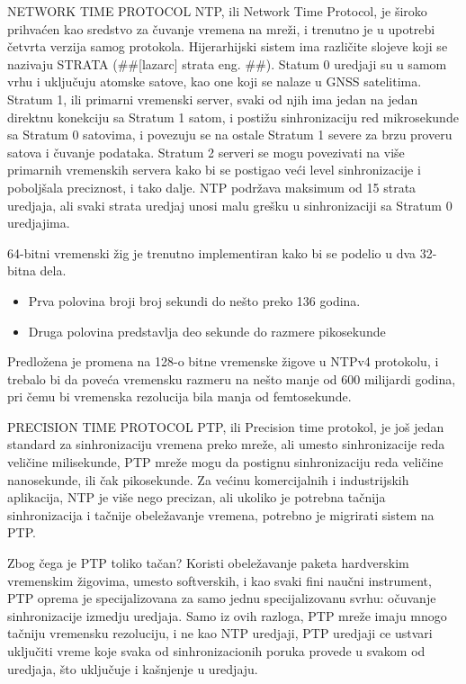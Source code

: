 \documentclass[a4paper,12pt, master]{etf}
\begin{document}
	NETWORK TIME PROTOCOL
	NTP, ili Network Time Protocol, je \v{s}iroko prihva\'{c}en kao sredstvo za \v{c}uvanje vremena na 
	mre\v{z}i, i trenutno je u upotrebi \v{c}etvrta verzija samog protokola. Hijerarhijski sistem ima 
	razli\v{c}ite slojeve koji se nazivaju STRATA (\#\#[lazarc] strata eng. \#\#). Statum 0 
	uredjaji su u samom vrhu i uklju\v{c}uju atomske satove, kao one koji se nalaze u GNSS 
	satelitima.	Stratum 1, ili primarni vremenski server, svaki od njih ima jedan na jedan 
	direktnu konekciju sa Stratum 1 satom, i posti\v{z}u sinhronizaciju red mikrosekunde sa Stratum 
	0 satovima, i povezuju se na ostale Stratum 1 severe za brzu proveru satova i \v{c}uvanje 
	podataka. Stratum 2 serveri se mogu povezivati na vi\v{s}e primarnih vremenskih servera kako 
	bi se postigao ve\'{c}i level sinhronizacije i pobolj\v{s}ala preciznost, i tako dalje. NTP 
	podr\v{z}ava maksimum od 15 strata uredjaja, ali svaki strata uredjaj unosi malu gre\v{s}ku u 
	sinhronizaciji sa Stratum 0 uredjajima.

	64-bitni vremenski \v{z}ig je trenutno implementiran kako bi se podelio u dva 32-bitna dela. 
	\begin{itemize}
		\item Prva polovina broji broj sekundi do ne\v{s}to preko 136 godina.
		\item Druga polovina predstavlja deo sekunde do razmere pikosekunde
	\end{itemize}

	Predlo\v{z}ena je promena na 128-o bitne vremenske \v{z}igove u NTPv4 protokolu, i trebalo bi da 
	pove\'{c}a vremensku razmeru na ne\v{s}to manje od 600 milijardi godina, pri \v{c}emu bi vremenska 
	rezolucija bila manja od femtosekunde.

	PRECISION TIME PROTOCOL
	PTP, ili Precision time protokol, je jo\v{s} jedan standard za sinhronizaciju vremena preko 
	mre\v{z}e, ali umesto sinhronizacije reda veli\v{c}ine milisekunde, PTP mre\v{z}e mogu da postignu 
	sinhronizaciju reda veli\v{c}ine nanosekunde, ili \v{c}ak pikosekunde. Za ve\'{c}inu komercijalnih i 
	industrijskih aplikacija, NTP je vi\v{s}e nego precizan, ali ukoliko je potrebna ta\v{c}nija 
	sinhronizacija i ta\v{c}nije obele\v{z}avanje vremena, potrebno je migrirati sistem na PTP.

	Zbog \v{c}ega je PTP toliko ta\v{c}an? Koristi obele\v{z}avanje paketa hardverskim vremenskim 
	\v{z}igovima, umesto softverskih, i kao svaki fini nau\v{c}ni instrument, PTP oprema je 
	specijalizovana za samo jednu specijalizovanu svrhu: o\v{c}uvanje sinhronizacije izmedju 
	uredjaja. Samo iz ovih razloga, PTP mre\v{z}e imaju mnogo ta\v{c}niju vremensku rezoluciju, i ne 
	kao NTP uredjaji, PTP uredjaji ce ustvari uklju\v{c}iti vreme koje svaka od sinhronizacionih 
	poruka provede u svakom od uredjaja, \v{s}to uklju\v{c}uje i ka\v{s}njenje u uredjaju.
\end{document}

